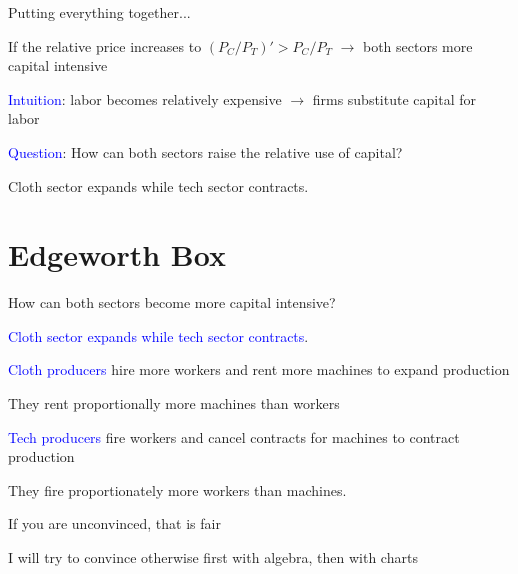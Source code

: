 \documentclass[notes,11pt, aspectratio=169, xcolor=table]{beamer}
\newcommand{\blue}[1]{\textcolor{blue}{#1}}
\newenvironment{wideitemize}{\itemize\addtolength{\itemsep}{10pt}}{\enditemize}
\begin{document}
\begin{frame}{Putting everything together...}

        \begin{wideitemize}
            \item If the relative price increases to $(P_C / P_T)' > P_C / P_T$ $\rightarrow$ both sectors more capital intensive

            \item<2-> \blue{Intuition}:  labor becomes relatively expensive $\rightarrow$ firms substitute capital for labor

            \item<3-> \blue{Question}: How can both sectors raise the relative use of capital?

            \item<4-> Cloth sector expands while tech sector contracts.


\end{wideitemize}
\end{frame}

\section{Edgeworth Box}


\begin{frame}{How can both sectors become more capital intensive?}

        \begin{wideitemize}

            \item \blue{Cloth sector expands while tech sector contracts}.

            \item<2-> \blue{Cloth producers} hire more workers and rent more machines to expand production

            \item<2-> They rent proportionally more machines than workers 

            \item<3-> \blue{Tech producers} fire workers and cancel contracts for machines to contract production
            
            \item<3-> They fire proportionately more workers than machines.

            \item<4-> If you are unconvinced, that is fair

            \item<4-> I will try to convince otherwise first with algebra, then with charts



\end{wideitemize}
\end{frame}
\end{document}
